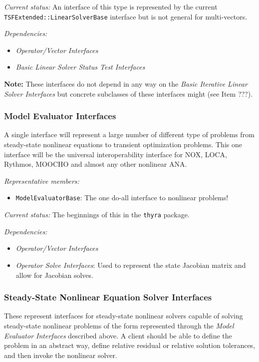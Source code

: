 \documentclass[pdf,ps2pdf,11pt]{SANDreport}
\begin{document}
{}\textit{Current status:} An interface of this type is represented by the
current {}\texttt{TSFExtended\-::Linear\-Solver\-Base} interface but is not
general for multi-vectors.

{}\textit{Dependencies:}
\begin{itemize}
\item {}\textit{Operator/Vector Interfaces}
\item {}\textit{Basic Linear Solver Status Test Interfaces}
\end{itemize}

{}\textbf{Note:} These interfaces do not depend in any way on the
{}\textit{Basic Iterative Linear Solver Interfaces} but concrete subclasses of
these interfaces might (see Item ???).

%
\subsubsection{Model Evaluator Interfaces}
%

A single interface will represent a large number of different type of problems
from steady-state nonlinear equations to transient optimization problems.
This one interface will be the universal interoperability interface for NOX,
LOCA, Rythmos, MOOCHO and almost any other nonlinear ANA.

{}\textit{Representative members:}
\begin{itemize}
%
{}\item {}\texttt{ModelEvaluatorBase}: The one do-all interface to nonlinear
problems!
%
\end{itemize}

{}\textit{Current status:} The beginnings of this in the {}\texttt{thyra} package.

{}\textit{Dependencies:}
\begin{itemize}
\item {}\textit{Operator/Vector Interfaces}
\item {}\textit{Operator Solve Interfaces}: Used to represent the state
Jacobian matrix and allow for Jacobian solves.
\end{itemize}

%
\subsubsection{Steady-State Nonlinear Equation Solver Interfaces}
%

These represent interfaces for steady-state nonlinear solvers capable of
solving steady-state nonlinear problems of the form represented through the
{}\textit{Model Evaluator Interfaces} described above.  A client should be
able to define the problem in an abstract way, define relative residual or
relative solution tolerances, and then invoke the nonlinear solver.
\end{document}
